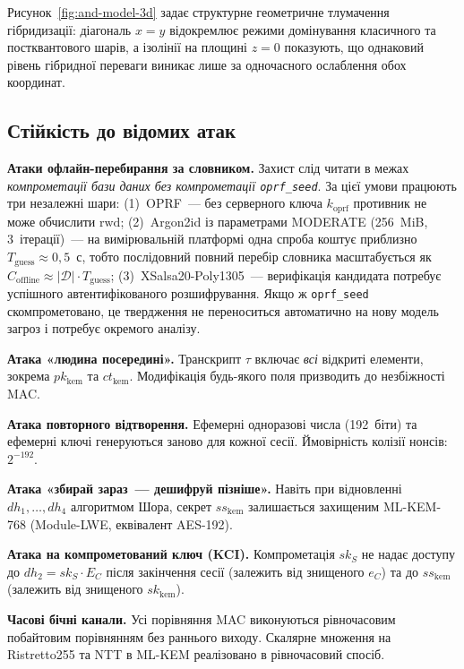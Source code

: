 \documentclass{llncs}
\begin{document}
Рисунок~\ref{fig:and-model-3d} задає структурне геометричне тлумачення
гібридизації: діагональ $x=y$ відокремлює режими домінування класичного
та постквантового шарів, а ізолінії на площині $z=0$ показують, що
однаковий рівень гібридної переваги виникає лише за одночасного
ослаблення обох координат.

\subsection{Стійкість до відомих атак}

\textbf{Атаки офлайн-перебирання за словником.} Захист слід читати в
межах \emph{компрометації бази даних без компрометації
\texttt{oprf\_seed}}. За цієї умови працюють три незалежні шари:
(1)~OPRF~--- без серверного ключа $k_{\mathrm{oprf}}$ противник не може
обчислити $\mathrm{rwd}$; (2)~Argon2id із параметрами MODERATE
(256~MiB, 3~ітерації)~--- на вимірювальній платформі одна спроба
коштує приблизно $T_{\mathrm{guess}} \approx 0{,}5$~с, тобто послідовний
повний перебір словника масштабується як
$C_{\mathrm{offline}} \approx |\mathcal{D}| \cdot T_{\mathrm{guess}}$;
(3)~XSalsa20-Poly1305~--- верифікація
кандидата потребує успішного автентифікованого розшифрування. Якщо ж
\texttt{oprf\_seed} скомпрометовано, це твердження не переноситься
автоматично на нову модель загроз і потребує окремого аналізу.

\textbf{Атака «людина посередині».} Транскрипт $\tau$ включає
\emph{всі} відкриті елементи, зокрема $pk_{\mathrm{kem}}$ та
$ct_{\mathrm{kem}}$. Модифікація будь-якого поля призводить до
незбіжності MAC.

\textbf{Атака повторного відтворення.} Ефемерні одноразові числа
(192~біти) та ефемерні ключі генеруються заново для кожної сесії.
Ймовірність колізії нонсів: $2^{-192}$.

\textbf{Атака «збирай зараз~--- дешифруй пізніше».} Навіть при
відновленні $dh_1,\ldots,dh_4$ алгоритмом Шора, секрет
$ss_{\mathrm{kem}}$ залишається захищеним ML-KEM-768
(Module-LWE, еквівалент AES-192).

\textbf{Атака на компрометований ключ (KCI).} Компрометація $sk_S$
не надає доступу до $dh_2 = sk_S \cdot E_C$ після закінчення сесії
(залежить від знищеного $e_C$) та до $ss_{\mathrm{kem}}$ (залежить
від знищеного $sk_{\mathrm{kem}}$).

\textbf{Часові бічні канали.} Усі порівняння MAC виконуються
рівночасовим побайтовим порівнянням без раннього виходу. Скалярне
множення на Ristretto255 та NTT в ML-KEM реалізовано в рівночасовий
спосіб.
\end{document}
